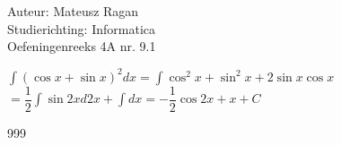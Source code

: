 \documentclass[a4paper]{article}
\begin{document}
\noindent \large Auteur: Mateusz Ragan \\
\noindent \large Studierichting: Informatica\\
\noindent \large Oefeningenreeks 4A nr. 9.1\\

\medskip

\normalsize

$\displaystyle\int(\cos x + \sin x)^2dx = \displaystyle\int\cos^2 x + \sin^2 x + 2\sin x\cos x $ \\

$= \dfrac{1}{2}\displaystyle\int\sin 2x d2x + \displaystyle\int dx = -\dfrac{1}{2}\cos 2x +x +C$

\begin{thebibliography}{999}
\end{thebibliography}
\end{document}
